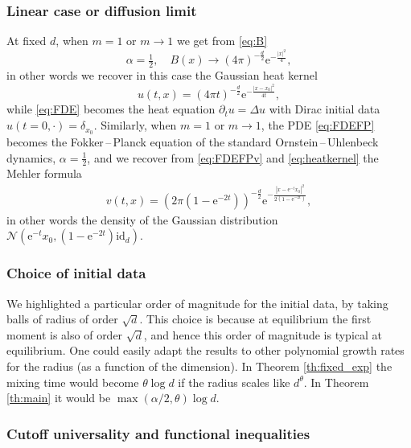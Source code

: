 \documentclass[10pt,reqno]{amsart}
\numberwithin{equation}{section}
\begin{document}
\subsubsection{Linear case or diffusion limit}\label{ss:difflim}
At fixed $d$, when $m=1$ or $m\to1$ we get from \eqref{eq:B}
\begin{equation}
    \alpha=\tfrac{1}{2},\quad B(x)\to(4\pi)^{-\frac{d}{2}}\mathrm{e}^{-\frac{|x|^2}{4}},
\end{equation} in other words we recover in this case the Gaussian heat kernel 
\begin{equation}\label{eq:heatkernel}
    u(t,x)=(4\pi t)^{-\frac{d}{2}}\mathrm{e}^{-\frac{|x-x_0|^2}{4t}},
\end{equation}while \eqref{eq:FDE} becomes the heat equation $\partial_tu=\Delta u$ with Dirac initial data $u(t=0,\cdot)=\delta_{x_0}$.
Similarly, when $m=1$ or $m\to1$, the PDE \eqref{eq:FDEFP} becomes the Fokker\,--\,Planck equation of the standard Ornstein\,--\,Uhlenbeck dynamics,  $\alpha=\frac{1}{2}$, and we recover from \eqref{eq:FDEFPv} and \eqref{eq:heatkernel} the Mehler formula 
\begin{align}
  v(t,x)
  =(2\pi(1-\mathrm{e}^{-2t}))^{-\frac{d}{2}}\mathrm{e}^{-\frac{|x-\mathrm{e}^{-t}x_0|^2}{2(1-\mathrm{e}^{-2t})}},
\end{align}
in other words the density of the Gaussian distribution $\mathcal{N}(\mathrm{e}^{-t}x_0,(1-\mathrm{e}^{-2t})\mathrm{id}_d)$.

\subsubsection{Choice of initial data} \label{sec:initialdata}
We highlighted a particular order of magnitude for the initial data, by taking balls of radius of order $\sqrt{d}$. This choice is because at equilibrium the first moment is also of order $\sqrt{d}$, and hence this order of magnitude is typical at equilibrium. One could easily adapt the results to other polynomial growth rates for the radius (as a function of the dimension). In Theorem \ref{th:fixed_exp} the mixing time would become $\theta \log d$ if the radius scales like $d^{\theta}$. In Theorem \ref{th:main} it would be $\max(\alpha/2, \theta)\log d$. 



\subsubsection{Cutoff universality and functional inequalities} 
\end{document}
